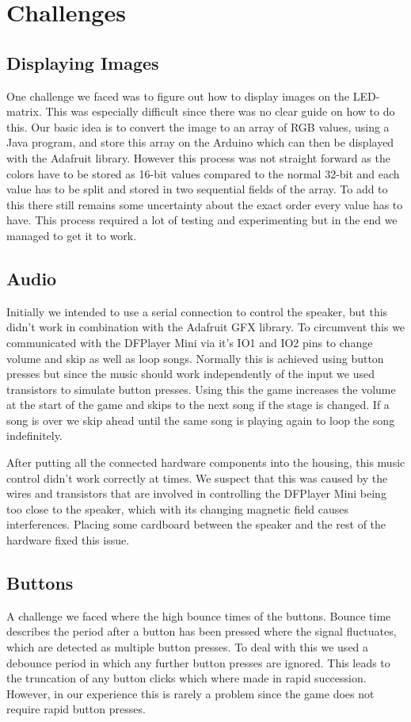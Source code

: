 \documentclass[10pt, a4paper]{article}
\begin{document}
\section*{Challenges}
\label{sec:challenges}

\subsection*{Displaying Images}
One challenge we faced was to figure out how to display images on the LED-matrix. This was especially difficult since there was no clear guide on how to do this. Our basic idea is to convert the image to an array of RGB values, using a Java program, and store this array on the Arduino which can then be displayed with the Adafruit library. However this process was not straight forward as the colors have to be stored as 16-bit values compared to the normal 32-bit and each value has to be split and stored in two sequential fields of the array. To add to this there still remains some uncertainty about the exact order every value has to have. This process required a lot of testing and experimenting but in the end we managed to get it to work. 

\subsection*{Audio}
Initially we intended to use a serial connection to control the speaker, but this didn't work in combination with the Adafruit GFX library. To circumvent this we communicated with the DFPlayer Mini via it's IO1 and IO2 pins to change volume and skip as well as loop songs. Normally this is achieved using button presses but since the music should work independently of the input we used transistors to simulate button presses. Using this the game increases the volume at the start of the game and skips to the next song if the stage is changed. If a song is over we skip ahead until the same song is playing again to loop the song indefinitely.

After putting all the connected hardware components into the housing, this music control didn't work correctly at times. We suspect that this was caused by the wires and transistors that are involved in controlling the DFPlayer Mini being too close to the speaker, which with its changing magnetic field causes interferences. Placing some cardboard between the speaker and the rest of the hardware fixed this issue. 

\subsection*{Buttons}
A challenge we faced where the high bounce times of the buttons. Bounce time describes the period after a button has been pressed where the signal fluctuates, which are detected as multiple button presses. To deal with this we used a debounce period in which any further button presses are ignored. This leads to the truncation of any button clicks which where made in rapid succession. However, in our experience this is rarely a problem since the game does not require rapid button presses. 
\end{document}

